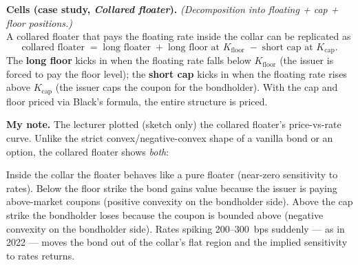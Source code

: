 \begin{keyblock}
\textbf{Cells (case study, \emph{Collared floater}).}
\emph{(Decomposition into floating + cap + floor positions.)}\\
A collared floater that pays the floating rate inside the collar can
be replicated as
\[
  \text{collared floater}
     \;=\; \text{long floater} \;+\; \text{long floor at } K_{\text{floor}}
        \;-\; \text{short cap at } K_{\text{cap}}.
\]
The \textbf{long floor} kicks in when the floating rate falls below
$K_{\text{floor}}$ (the issuer is forced to pay the floor level); the
\textbf{short cap} kicks in when the floating rate rises above
$K_{\text{cap}}$ (the issuer caps the coupon for the bondholder). With
the cap and floor priced via Black's formula, the entire structure is
priced.
\end{keyblock}

\begin{checkpoint}
\textbf{My note.} The lecturer plotted (sketch only) the collared
floater's price-vs-rate curve. Unlike the strict convex/negative-convex
shape of a vanilla bond or an option, the collared floater shows
\emph{both}:
\begin{center}
\end{center}
Inside the collar the floater behaves like a pure floater (near-zero
sensitivity to rates). Below the floor strike the bond gains value
because the issuer is paying above-market coupons (positive convexity
on the bondholder side). Above the cap strike the bondholder loses
because the coupon is bounded above (negative convexity on the
bondholder side). Rates spiking 200--300~bps suddenly --- as in 2022 ---
moves the bond out of the collar's flat region and the implied
sensitivity to rates returns.
\end{checkpoint}

